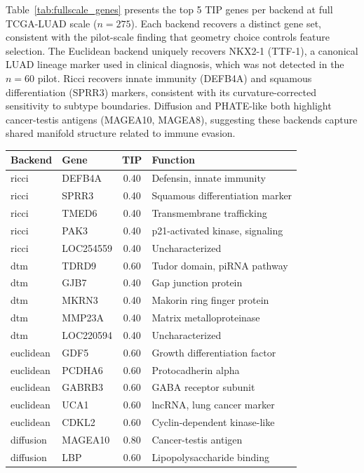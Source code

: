 \documentclass[11pt]{article}
\begin{document}
Table~\ref{tab:fullscale_genes} presents the top 5 TIP genes per backend at full TCGA-LUAD scale ($n = 275$).
Each backend recovers a distinct gene set, consistent with the pilot-scale finding that geometry choice controls feature selection.
The Euclidean backend uniquely recovers NKX2-1 (TTF-1), a canonical LUAD lineage marker used in clinical diagnosis, which was not detected in the $n = 60$ pilot.
Ricci recovers innate immunity (DEFB4A) and squamous differentiation (SPRR3) markers, consistent with its curvature-corrected sensitivity to subtype boundaries.
Diffusion and PHATE-like both highlight cancer-testis antigens (MAGEA10, MAGEA8), suggesting these backends capture shared manifold structure related to immune evasion.

\begin{table}[h]
\centering\small
\begin{tabular}{llcl}
\toprule
\textbf{Backend} & \textbf{Gene} & \textbf{TIP} & \textbf{Function} \\
\midrule
ricci & DEFB4A & 0.40 & Defensin, innate immunity \\
ricci & SPRR3 & 0.40 & Squamous differentiation marker \\
ricci & TMED6 & 0.40 & Transmembrane trafficking \\
ricci & PAK3 & 0.40 & p21-activated kinase, signaling \\
ricci & LOC254559 & 0.40 & Uncharacterized \\
\midrule
dtm & TDRD9 & 0.60 & Tudor domain, piRNA pathway \\
dtm & GJB7 & 0.40 & Gap junction protein \\
dtm & MKRN3 & 0.40 & Makorin ring finger protein \\
dtm & MMP23A & 0.40 & Matrix metalloproteinase \\
dtm & LOC220594 & 0.40 & Uncharacterized \\
\midrule
euclidean & GDF5 & 0.60 & Growth differentiation factor \\
euclidean & PCDHA6 & 0.60 & Protocadherin alpha \\
euclidean & GABRB3 & 0.60 & GABA receptor subunit \\
euclidean & UCA1 & 0.60 & lncRNA, lung cancer marker \\
euclidean & CDKL2 & 0.60 & Cyclin-dependent kinase-like \\
\midrule
diffusion & MAGEA10 & 0.80 & Cancer-testis antigen \\
diffusion & LBP & 0.60 & Lipopolysaccharide binding \\

\end{tabular}
\end{table}
\end{document}
